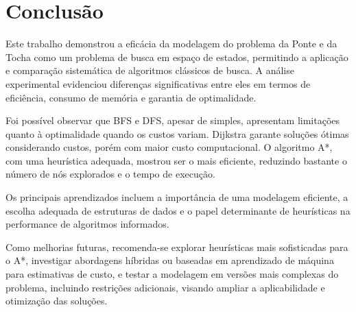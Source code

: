 \documentclass[12pt,a4paper]{article}
\begin{document}
\section{Conclusão}

Este trabalho demonstrou a eficácia da modelagem do problema da Ponte e da Tocha como um problema de busca em espaço de estados, permitindo a aplicação e comparação sistemática de algoritmos clássicos de busca. A análise experimental evidenciou diferenças significativas entre eles em termos de eficiência, consumo de memória e garantia de optimalidade.  

Foi possível observar que BFS e DFS, apesar de simples, apresentam limitações quanto à optimalidade quando os custos variam. Dijkstra garante soluções ótimas considerando custos, porém com maior custo computacional. O algoritmo A*, com uma heurística adequada, mostrou ser o mais eficiente, reduzindo bastante o número de nós explorados e o tempo de execução.  

Os principais aprendizados incluem a importância de uma modelagem eficiente, a escolha adequada de estruturas de dados e o papel determinante de heurísticas na performance de algoritmos informados.  

Como melhorias futuras, recomenda-se explorar heurísticas mais sofisticadas para o A*, investigar abordagens híbridas ou baseadas em aprendizado de máquina para estimativas de custo, e testar a modelagem em versões mais complexas do problema, incluindo restrições adicionais, visando ampliar a aplicabilidade e otimização das soluções.

\clearpage
{}


\end{document}
